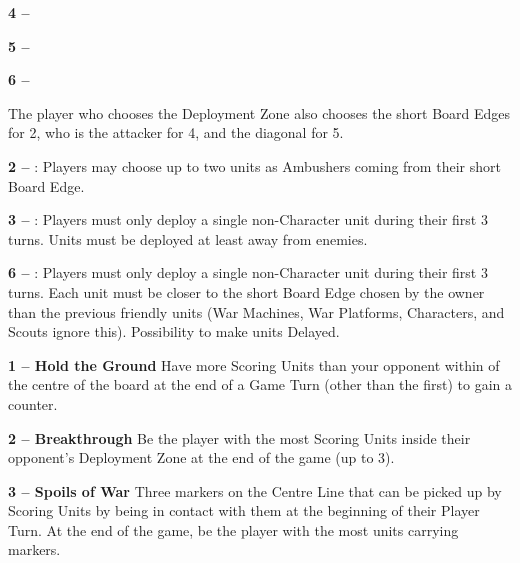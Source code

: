 \begin{minipage}[t]{0.70\textwidth}
\begin{minipage}{0.315\textwidth}
\def\deploymentfigAttacker{Attacker}
\def\deploymentfigDefender{Defender}
\textbf{4 -- \encircle{}}\newline
\def\svgwidth{\textwidth}

\end{minipage}\hfill\begin{minipage}{0.315\textwidth}
\textbf{5 -- }\newline
\def\svgwidth{\textwidth}

\end{minipage}\hfill\begin{minipage}{0.315\textwidth}
\textbf{6 -- \marchingcolumns{}}\newline
\def\svgwidth{\textwidth}
\def\MarchColfontsize{\fontsize{5.5}{7}\selectfont}

\end{minipage}

The player who chooses the Deployment Zone also chooses the short Board Edges for 2, who is the attacker for 4, and the diagonal for 5.

\textbf{2 -- \dawnassault{}}: Players may choose up to two units as Ambushers coming from their short Board Edge.

\textbf{3 -- \counterthrust{}}: Players must only deploy a single non-Character unit during their first 3 turns. Units must be deployed at least  away from enemies.

\textbf{6 -- \marchingcolumns{}}: Players must only deploy a single non-Character unit during their first 3 turns. Each unit must be closer to the short Board Edge chosen by the owner than the previous friendly units (War Machines, War Platforms, Characters, and Scouts ignore this). Possibility to make units Delayed.
\end{minipage}

\vspace*{-5pt}

\begin{minipage}[t]{0.32\textwidth}
\textbf{1 -- Hold the Ground}\newline
Have more Scoring Units than your opponent within  of the centre of the board at the end of a Game Turn (other than the first) to gain a counter.
\end{minipage}\hfill\begin{minipage}[t]{0.32\textwidth}
\textbf{2 -- Breakthrough}\newline
Be the player with the most Scoring Units inside their opponent’s Deployment Zone at the end of the game (up to 3).
\end{minipage}\hfill\begin{minipage}[t]{0.32\textwidth}
\textbf{3 -- Spoils of War}\newline
Three markers on the Centre Line that can be picked up by Scoring Units by being in contact with them at the beginning of their Player Turn. At the end of the game, be the player with the most units carrying markers.
\end{minipage}

